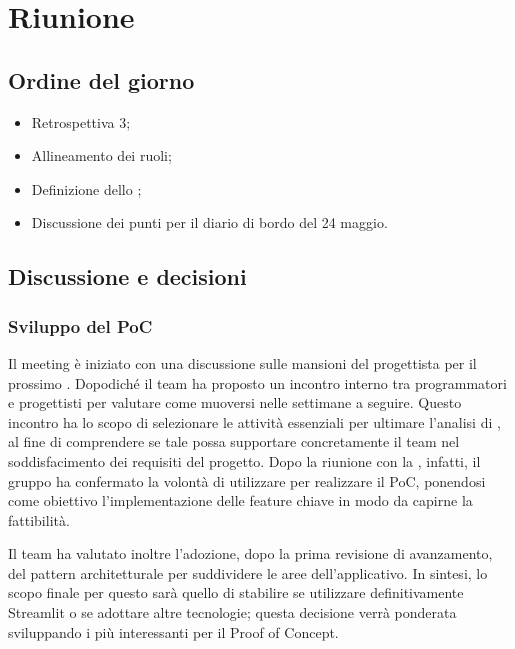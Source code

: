 \section{Riunione}
\subsection{Ordine del giorno}
\begin{itemize}
	\item Retrospettiva  3;
	\item Allineamento dei ruoli;
	\item Definizione dello ;
	\item Discussione dei punti per il diario di bordo del 24 maggio.
\end{itemize}

\subsection{Discussione e decisioni}
\subsubsection{Sviluppo del PoC}
\par Il meeting è iniziato con una discussione sulle mansioni del progettista per il prossimo . 
Dopodiché il team ha proposto un incontro interno tra programmatori e progettisti per valutare come muoversi nelle settimane a seguire. 
Questo incontro ha lo scopo di selezionare le attività essenziali per ultimare l'analisi di , al fine di comprendere se tale  possa supportare concretamente il team nel soddisfacimento dei requisiti del progetto.
Dopo la riunione con la , infatti, il gruppo ha confermato la volontà di utilizzare  per realizzare il PoC, ponendosi come obiettivo l'implementazione delle feature chiave in modo da capirne la fattibilità.
\par Il team ha valutato inoltre l'adozione, dopo la prima revisione di avanzamento, del pattern architetturale  per suddividere le aree dell'applicativo. 
In sintesi, lo scopo finale per questo  sarà quello di stabilire se utilizzare definitivamente Streamlit o se adottare altre tecnologie; questa decisione verrà ponderata sviluppando i  più interessanti per il Proof of Concept.
